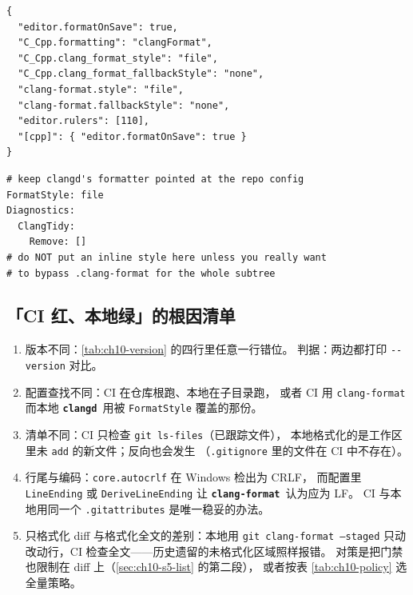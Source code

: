 \documentclass[12pt,a4paper,fontset=fandol]{ctexbook}
\newcommand{\Opt}[1]{\texttt{-\/-#1}}
\newcommand{\Bk}{\discretionary{}{}{}}
\newcommand{\Lib}[1]{\textbf{\texttt{#1}}}
\newcommand{\Fmt}{\Lib{clang-format}}
\newcommand{\CD}{\Lib{clangd}}
\begin{document}
\begin{lstlisting}[style=jsonstyle,caption={编辑器侧最小一致配置（VS Code 风格）},label={lst:ch10-editor}]
{
  "editor.formatOnSave": true,
  "C_Cpp.formatting": "clangFormat",
  "C_Cpp.clang_format_style": "file",
  "C_Cpp.clang_format_fallbackStyle": "none",
  "clang-format.style": "file",
  "clang-format.fallbackStyle": "none",
  "editor.rulers": [110],
  "[cpp]": { "editor.formatOnSave": true }
}
\end{lstlisting}

\begin{lstlisting}[style=yamlstyle,caption={\texttt{.clangd} 里与格式化有关的写法},label={lst:ch10-clangd}]
# keep clangd's formatter pointed at the repo config
FormatStyle: file
Diagnostics:
  ClangTidy:
    Remove: []
# do NOT put an inline style here unless you really want
# to bypass .clang-format for the whole subtree
\end{lstlisting}

\subsection{「CI 红、本地绿」的根因清单}\label{sec:ch10-s6-green}

\begin{enumerate}
  \item 版本不同：\ref{tab:ch10-version} 的四行里任意一行错位。
    判据：两边都打印 \Opt{version} 对比。
  \item 配置查找不同：CI 在仓库根跑、本地在子目录跑，
    或者 CI 用 \texttt{clang-format} 而本地 \CD\ 用被 \texttt{FormatStyle} 覆盖的那份。
  \item 清单不同：CI 只检查 \texttt{git ls-files}（已跟踪文件），
    本地格式化的是工作区里未 \texttt{add} 的新文件；反向也会发生
    （\texttt{.gitignore} 里的文件在 CI 中不存在）。
  \item 行尾与编码：\texttt{core.{\Bk}autocrlf} 在 Windows 检出为 CRLF，
    而配置里 \texttt{LineEnding} 或 \texttt{Derive{\Bk}Line{\Bk}Ending} 让 \Fmt\ 认为应为 LF。
    CI 与本地用同一个 \texttt{.gitattributes} 是唯一稳妥的办法。
  \item 只格式化 diff 与格式化全文的差别：本地用 \texttt{git clang-{\Bk}format --staged}
    只动改动行，CI 检查全文——历史遗留的未格式化区域照样报错。
    对策是把门禁也限制在 diff 上（\ref{sec:ch10-s5-list} 的第二段），
    或者按表 \ref{tab:ch10-policy} 选全量策略。
\end{enumerate}
\end{document}
